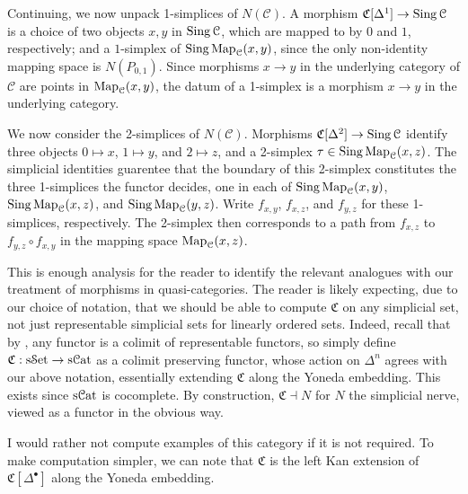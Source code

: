 Continuing, we now unpack 1-simplices of $N(\mathcal{C} )$. A morphism $\mathfrak{C} [\Delta ^1]\to \operatorname{Sing} \mathcal{C} $ is a choice of two objects $x,y$ in $\operatorname{Sing} \mathcal{C} $, which are mapped to by $0$ and $1$, respectively; and a $1$-simplex of $\operatorname{Sing}\operatorname{Map}_\mathcal{C} (x,y)$, since the only non-identity mapping space is $N(P_{0,1} )$. Since morphisms $x\to y$ in the underlying category of $\mathcal{C} $ are points in $\operatorname{Map}_\mathcal{C} (x,y)$, the datum of a 1-simplex is a morphism $x\to y$ in the underlying category.

We now consider the 2-simplices of $N(\mathcal{C} )$. Morphisms $\mathfrak{C} [\Delta ^2]\to \operatorname{Sing} \mathcal{C} $ identify three objects $0\mapsto x$, $1\mapsto y$, and $2\mapsto z$, and a 2-simplex $\tau \in \operatorname{Sing}\operatorname{Map}_\mathcal{C} (x,z)$. The simplicial identities guarentee that the boundary of this 2-simplex constitutes the three 1-simplices the functor decides, one in each of $\operatorname{Sing}\operatorname{Map}_\mathcal{C} (x,y)$, $\operatorname{Sing}\operatorname{Map}_\mathcal{C} (x,z)$, and $\operatorname{Sing}\operatorname{Map}_\mathcal{C} (y,z)$. Write $f_{x,y} $, $f_{x,z} $, and $f_{y,z} $ for these 1-simplices, respectively. The 2-simplex then corresponds to a path from $f_{x,z} $ to $f_{y,z} \circ f_{x,y} $ in the mapping space $\operatorname{Map}_\mathcal{C} (x,z)$.

This is enough analysis for the reader to identify the relevant analogues with our treatment of morphisms in quasi-categories. The reader is likely expecting, due to our choice of notation, that we should be able to compute $\mathfrak{C} $ on any simplicial set, not just representable simplicial sets for linearly ordered sets. Indeed, recall that by \cite[III.7]{maclane}, any functor is a colimit of representable functors, so simply define $\mathfrak{C} : \mathrm{s}\mathcal{S}\mathrm{et}  \to \mathrm{s} \mathcal{C}\mathrm{at} $ as a colimit preserving functor, whose action on $\Delta ^n$ agrees with our above notation, essentially extending $\mathfrak{C} $ along the Yoneda embedding. This exists since $\mathrm{s} \mathcal{C}\mathrm{at} $ is cocomplete. By construction, $\mathfrak{C} \dashv N$ for $N$ the simplicial nerve, viewed as a functor in the obvious way.

I would rather not compute examples of this category if it is not required. To make computation simpler, we can note that $\mathfrak{C} $ is the left Kan extension of $\mathfrak{C} [\Delta ^{\bullet} ]$ along the Yoneda embedding.

